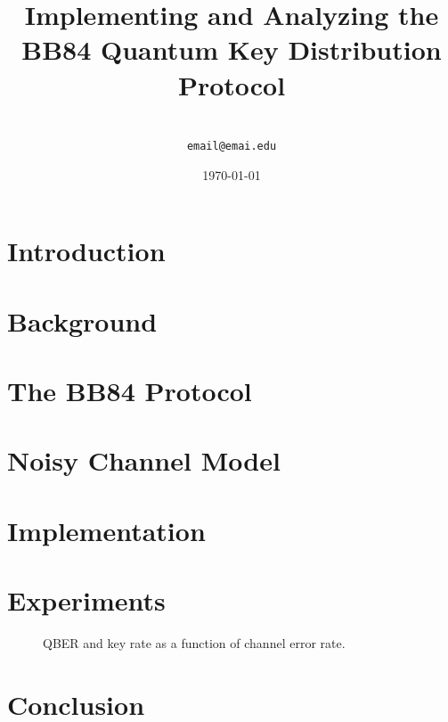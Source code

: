 \documentclass[11pt]{article}
\title{Implementing and Analyzing the BB84 Quantum Key Distribution Protocol}
\author{%
  \\
  \texttt{email@emai.edu}
}
\date{\today}
\begin{document}
\maketitle

\begin{abstract}
\end{abstract}

\section{Introduction}

\section{Background}
\label{sec:background}

\section{The BB84 Protocol}
\label{sec:bb84}

\section{Noisy Channel Model}
\label{sec:channel}

\section{Implementation}
\label{sec:implementation}

\section{Experiments}
\label{sec:experiments}

\begin{figure}[ht]
  \centering
  \caption{QBER and key rate as a function of channel error rate.}
  \label{fig:qber-sweep}
\end{figure}

\section{Conclusion}
\label{sec:conclusion}



\end{document}
